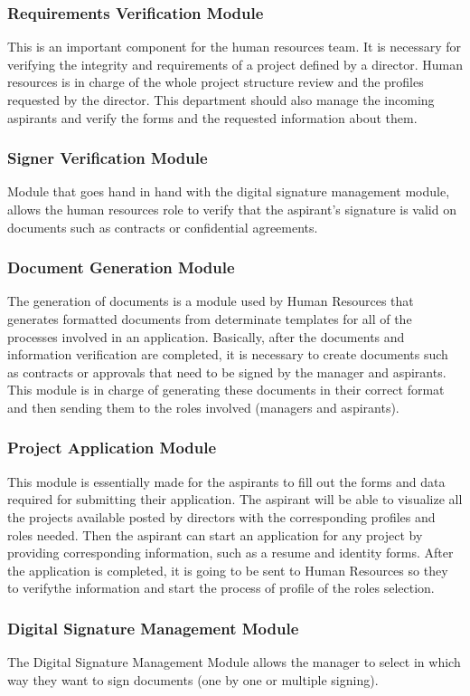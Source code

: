 \documentclass{scrreprt}
\begin{document}
\subsubsection{Requirements Verification Module}
This is an important component for the human resources team. It is necessary for verifying the integrity and requirements of a project defined by a director. Human resources is in charge of the whole project structure review and the profiles requested by the director. This department should also manage the incoming aspirants and verify the forms and the requested information about them.
\subsubsection{Signer Verification Module}
Module that goes hand in hand with the digital signature management module, allows the human resources role to verify that the aspirant's signature is valid on documents such as contracts or confidential agreements.
\subsubsection{Document Generation Module}
The generation of documents is a module used by Human Resources that generates formatted documents from determinate templates for all of the processes involved in an application. Basically, after the documents and information verification are completed, it is necessary to create documents such as contracts or approvals that need to be signed by the manager and aspirants. This module is in charge of generating these documents in their correct format and then sending them to the roles involved (managers and aspirants).
\subsubsection{Project Application Module}
This module is essentially made for the aspirants to fill out the forms and data required for submitting their application. The aspirant will be able to visualize all the projects available posted by directors with the corresponding profiles and roles needed. Then the aspirant can start an application for any project by providing corresponding information, such as a resume and identity forms. After the application is completed, it is going to be sent to Human Resources so they to verifythe information and start the process of profile of the roles selection.
\subsubsection{Digital Signature Management Module}
The Digital Signature Management Module allows the manager to select in which way they want to sign documents (one by one or multiple signing). 
\end{document}
